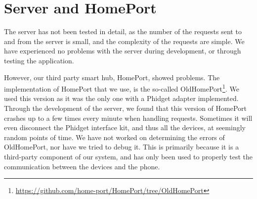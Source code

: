 \section{Server and HomePort}\label{sec:servereval}
The server has not been tested in detail, 
as the number of the requests sent to and from the server is small,
and the complexity of the requests are simple. 
We have experienced no problems with the server during development,
or through testing the application. 

However, our third party smart hub, HomePort, showed problems. 
The implementation of HomePort that we use, 
is the so-called OldHomePort\footnote{\url{https://github.com/home-port/HomePort/tree/OldHomePort}}. 
We used this version as it was the only one with a Phidget adapter implemented. 
Through the development of the server, 
we found that this version of HomePort crashes up to a few times every minute when handling requests. 
Sometimes it will even disconnect the Phidget interface kit, 
and thus all the devices, at seemingly random points of time. 
We have not worked on determining the errors of OldHomePort, 
nor have we tried to debug it. 
This is primarily because it is a third-party component of our system, 
and has only been used to properly test the communication between the devices and the phone. 